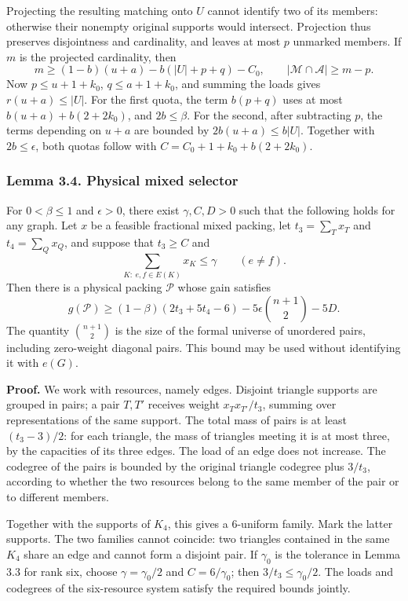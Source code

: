 \documentclass[english,11pt,a4paper]{article}
\newcounter{none}
\begin{document}
Projecting the resulting matching onto \(U\) cannot identify two of its members: otherwise their nonempty original supports would intersect. Projection thus preserves disjointness and cardinality, and leaves at most \(p\) unmarked members. If \(m\) is the projected cardinality, then \[
m\ge(1-b)(u+a)-b(|U|+p+q)-C_0,
\qquad |\mathcal M\cap\mathcal A|\ge m-p.
\] Now \(p\le u+1+k_0\), \(q\le a+1+k_0\), and summing the loads gives \(r(u+a)\le|U|\). For the first quota, the term \(b(p+q)\) uses at most \(b(u+a)+b(2+2k_0)\), and \(2b\le\beta\). For the second, after subtracting \(p\), the terms depending on \(u+a\) are bounded by \(2b(u+a)\le b|U|\). Together with \(2b\le\epsilon\), both quotas follow with \(C=C_0+1+k_0+b(2+2k_0)\).

\subsubsection{Lemma 3.4. Physical mixed selector}\label{lemma-3.4.-physical-mixed-selector}

For \(0<\beta\le1\) and \(\epsilon>0\), there exist \(\gamma,C,D>0\) such that the following holds for any graph. Let \(x\) be a feasible fractional mixed packing, let \(t_3=\sum_Tx_T\) and \(t_4=\sum_Qx_Q\), and suppose that \(t_3\ge C\) and \[
\sum_{K:\ e,f\in E(K)}x_K\le\gamma\qquad(e\ne f).
\tag{3.5}
\] Then there is a physical packing \(\mathcal P\) whose gain satisfies \[
g(\mathcal P)\ge(1-\beta)(2t_3+5t_4-6)
 -5\epsilon\binom{n+1}{2}-5D.
\tag{3.6}
\] The quantity \(\binom{n+1}{2}\) is the size of the formal universe of unordered pairs, including zero-weight diagonal pairs. This bound may be used without identifying it with \(e(G)\).

\textbf{Proof.} We work with resources, namely edges. Disjoint triangle supports are grouped in pairs; a pair \(T,T'\) receives weight \(x_Tx_{T'}/t_3\), summing over representations of the same support. The total mass of pairs is at least \((t_3-3)/2\): for each triangle, the mass of triangles meeting it is at most three, by the capacities of its three edges. The load of an edge does not increase. The codegree of the pairs is bounded by the original triangle codegree plus \(3/t_3\), according to whether the two resources belong to the same member of the pair or to different members.

Together with the supports of \(K_4\), this gives a 6-uniform family. Mark the latter supports. The two families cannot coincide: two triangles contained in the same \(K_4\) share an edge and cannot form a disjoint pair. If \(\gamma_0\) is the tolerance in Lemma 3.3 for rank six, choose \(\gamma=\gamma_0/2\) and \(C=6/\gamma_0\); then \(3/t_3\le\gamma_0/2\). The loads and codegrees of the six-resource system satisfy the required bounds jointly.
\end{document}
